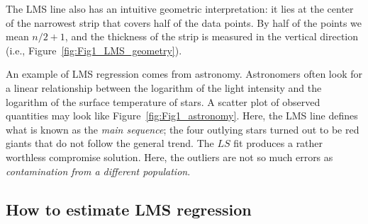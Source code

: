 
The LMS line also has an intuitive geometric interpretation: it lies at the center of the narrowest 
strip that covers half of the data points.  By half of the points we mean $n/2 + 1$, and the thickness of 
the strip is measured in the vertical direction (i.e., Figure~\ref{fig:Fig1_LMS_geometry}).
	 
An example of LMS regression comes from astronomy.  Astronomers often look for a linear 
relationship between the logarithm of the light intensity and the logarithm of the surface temperature of stars.  A 
scatter plot of observed quantities may look like Figure~\ref{fig:Fig1_astronomy}.  Here, the LMS line defines what is known 
as the \emph{main sequence}; the four outlying stars turned out to be red giants that do not follow the general 
trend.  The $LS$ fit produces a rather worthless compromise solution.  Here, the outliers are not so 
much errors as \emph{contamination from a different population}.


\subsection{How to estimate LMS regression}

